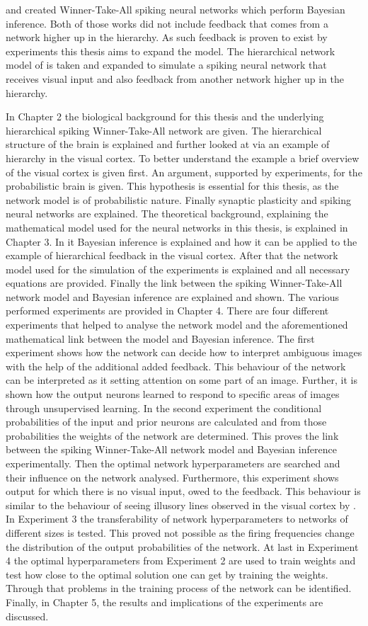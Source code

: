 \citet{nessler} and \citet{nesslerClone} created Winner-Take-All spiking neural networks which perform Bayesian inference. Both of those works did not include feedback that comes from a network higher up in the hierarchy. As such feedback is proven to exist by experiments this thesis aims to expand the model. The hierarchical network model of \citet{nessler} is taken and expanded to simulate a spiking neural network that receives visual input and also feedback from another network higher up in the hierarchy.

In Chapter 2 the biological background for this thesis and the underlying hierarchical spiking Winner-Take-All network are given. The hierarchical structure of the brain is explained and further looked at via an example of hierarchy in the visual cortex. To better understand the example a brief overview of the visual cortex is given first. An argument, supported by experiments, for the probabilistic brain is given. This hypothesis is essential for this thesis, as the network model is of probabilistic nature. Finally synaptic plasticity and spiking neural networks are explained.
The theoretical background, explaining the mathematical model used for the neural networks in this thesis, is explained in Chapter 3. In it Bayesian inference is  explained and how it can be applied to the example of hierarchical feedback in the visual cortex. After that the network model used for the simulation of the experiments is explained and all necessary equations are provided. Finally the link between the spiking Winner-Take-All network model and Bayesian inference are  explained and shown.
The various performed experiments are provided in Chapter 4. There are four different experiments that helped to analyse the network model and the aforementioned mathematical link between the model and Bayesian inference. The first experiment shows how the network can decide how to interpret ambiguous images with the help of the additional added feedback. This behaviour of the network can be interpreted as it setting attention on some part of an image. Further, it is shown how the output neurons learned to respond to specific areas of images through unsupervised learning. In the second experiment the conditional probabilities of the input and prior neurons are calculated and from those probabilities the weights of the network are determined. This proves the link between the spiking Winner-Take-All network model and Bayesian inference experimentally. Then the optimal network hyperparameters are searched and their influence on the network analysed. Furthermore, this experiment shows output for which there is no visual input, owed to the feedback. This behaviour is similar to the behaviour of seeing illusory lines observed in the visual cortex by \citet{HierachicalBayesVisualCortex}. In Experiment 3 the transferability of network hyperparameters to networks of different sizes is tested. This proved not possible as the firing frequencies change the distribution of the output probabilities of the network. At last in Experiment 4 the optimal hyperparameters from Experiment 2 are used to train weights and test how close to the optimal solution one can get by training the weights. Through that problems in the training process of the network can be identified.
Finally, in Chapter 5, the results and implications of the experiments are discussed.
